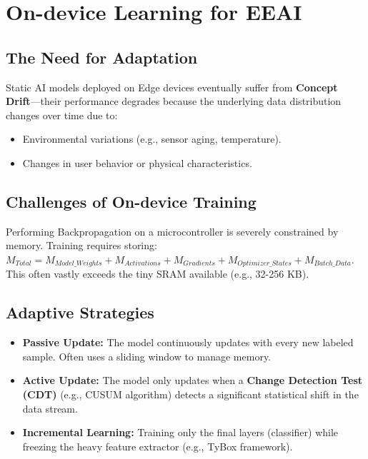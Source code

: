 \section{On-device Learning for EEAI}

\subsection{The Need for Adaptation}
Static AI models deployed on Edge devices eventually suffer from \textbf{Concept Drift}—their performance degrades because the underlying data distribution changes over time due to:
\begin{itemize}
    \item Environmental variations (e.g., sensor aging, temperature).
    \item Changes in user behavior or physical characteristics.
\end{itemize}

\subsection{Challenges of On-device Training}
Performing Backpropagation on a microcontroller is severely constrained by memory. Training requires storing:
$M_{Total} = M_{Model\_Weights} + M_{Activations} + M_{Gradients} + M_{Optimizer\_States} + M_{Batch\_Data}$.
This often vastly exceeds the tiny SRAM available (e.g., 32-256 KB).

\subsection{Adaptive Strategies}
\begin{itemize}
    \item \textbf{Passive Update:} The model continuously updates with every new labeled sample. Often uses a sliding window to manage memory.
    \item \textbf{Active Update:} The model only updates when a \textbf{Change Detection Test (CDT)} (e.g., CUSUM algorithm) detects a significant statistical shift in the data stream.
    \item \textbf{Incremental Learning:} Training only the final layers (classifier) while freezing the heavy feature extractor (e.g., TyBox framework).
\end{itemize}

